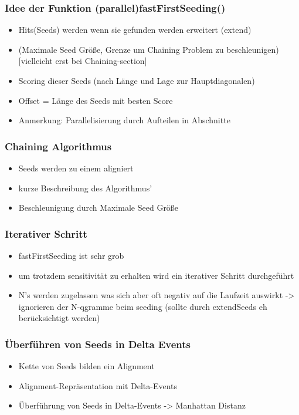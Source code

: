 \documentclass[11pt]{article}
\begin{document}
\subsubsection{Idee der Funktion (parallel)fastFirstSeeding()}
\begin{itemize}
\item Hits(Seeds) werden wenn sie gefunden werden erweitert (extend)
\item (Maximale Seed Größe, Grenze um Chaining Problem zu beschleunigen)[vielleicht erst bei Chaining-section]
\item Scoring dieser Seeds (nach Länge und Lage zur Hauptdiagonalen)
\item Offset = Länge des Seeds mit besten Score
\item Anmerkung: Parallelisierung durch Aufteilen in Abschnitte
\end{itemize}

\subsubsection{Chaining Algorithmus}
\begin{itemize}
\item Seeds werden zu einem aligniert
\item kurze Beschreibung des Algorithmus'
\item Beschleunigung durch Maximale Seed Größe
\end{itemize}

\subsubsection{Iterativer Schritt}
\begin{itemize}
\item fastFirstSeeding ist sehr grob
\item um trotzdem sensitivität zu erhalten wird ein iterativer Schritt durchgeführt
\item N's werden zugelassen was sich aber oft negativ auf die Laufzeit auswirkt -> ignorieren der N-qgramme beim seeding (sollte durch extendSeeds eh berücksichtigt werden)
\end{itemize}

\subsubsection{Überführen von Seeds in Delta Events}
\begin{itemize}
\item Kette von Seeds bilden ein Alignment
\item Alignment-Repräsentation mit Delta-Events
\item Überführung von Seeds in Delta-Events -> Manhattan Distanz
\end{itemize}
\end{document}
